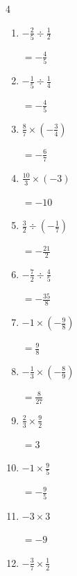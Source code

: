 \begin{multicols}{4}
\begin{enumerate}
        $\displaystyle =-\frac{10}{3}$

  \item $\displaystyle -\frac{2}{5}\div{}\frac{1}{2}$

        $\displaystyle =-\frac{4}{5}$

  \item $\displaystyle -\frac{1}{5}\div{}\frac{1}{4}$

        $\displaystyle =-\frac{4}{5}$

  \item $\displaystyle \frac{8}{7}\times{}\left(-\frac{3}{4}\right)$

        $\displaystyle =-\frac{6}{7}$

  \item $\displaystyle \frac{10}{3}\times{}\left(-3\right)$

        $\displaystyle =-10$

  \item $\displaystyle \frac{3}{2}\div{}\left(-\frac{1}{7}\right)$

        $\displaystyle =-\frac{21}{2}$

  \item $\displaystyle -\frac{7}{2}\div{}\frac{4}{5}$

        $\displaystyle =-\frac{35}{8}$

  \item $\displaystyle -1\times{}\left(-\frac{9}{8}\right)$

        $\displaystyle =\frac{9}{8}$

\columnbreak %

  \item $\displaystyle -\frac{1}{3}\times{}\left(-\frac{8}{9}\right)$

        $\displaystyle =\frac{8}{27}$

  \item $\displaystyle \frac{2}{3}\times{}\frac{9}{2}$

        $\displaystyle =3$

  \item $\displaystyle -1\times{}\frac{9}{5}$

        $\displaystyle =-\frac{9}{5}$

  \item $\displaystyle -3\times{}3$

        $\displaystyle =-9$

  \item $\displaystyle -\frac{3}{7}\times{}\frac{1}{2}$


\end{enumerate}
\end{multicols}
